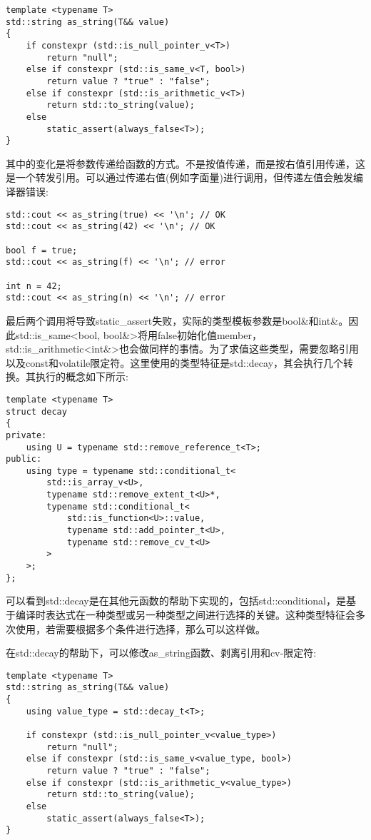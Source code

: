 \begin{lstlisting}[style=styleCXX]
template <typename T>
std::string as_string(T&& value)
{
	if constexpr (std::is_null_pointer_v<T>)
		return "null";
	else if constexpr (std::is_same_v<T, bool>)
		return value ? "true" : "false";
	else if constexpr (std::is_arithmetic_v<T>)
		return std::to_string(value);
	else
		static_assert(always_false<T>);
}
\end{lstlisting}

其中的变化是将参数传递给函数的方式。不是按值传递，而是按右值引用传递，这是一个转发引用。可以通过传递右值(例如字面量)进行调用，但传递左值会触发编译器错误:

\begin{lstlisting}[style=styleCXX]
std::cout << as_string(true) << '\n'; // OK
std::cout << as_string(42) << '\n'; // OK

bool f = true;
std::cout << as_string(f) << '\n'; // error

int n = 42;
std::cout << as_string(n) << '\n'; // error
\end{lstlisting}

最后两个调用将导致static\_assert失败，实际的类型模板参数是bool\&和int\&。因此std::is\_same<bool, bool\&>将用false初始化值member，std::is\_arithmetic<int\&>也会做同样的事情。为了求值这些类型，需要忽略引用以及const和volatile限定符。这里使用的类型特征是std::decay，其会执行几个转换。其执行的概念如下所示:

\begin{lstlisting}[style=styleCXX]
template <typename T>
struct decay
{
private:
	using U = typename std::remove_reference_t<T>;
public:
	using type = typename std::conditional_t<
		std::is_array_v<U>,
		typename std::remove_extent_t<U>*,
		typename std::conditional_t<
			std::is_function<U>::value,
			typename std::add_pointer_t<U>,
			typename std::remove_cv_t<U>
		>
	>;
};
\end{lstlisting}

可以看到std::decay是在其他元函数的帮助下实现的，包括std::conditional，是基于编译时表达式在一种类型或另一种类型之间进行选择的关键。这种类型特征会多次使用，若需要根据多个条件进行选择，那么可以这样做。

在std::decay的帮助下，可以修改as\_string函数、剥离引用和cv-限定符:

\begin{lstlisting}[style=styleCXX]
template <typename T>
std::string as_string(T&& value)
{
	using value_type = std::decay_t<T>;

	if constexpr (std::is_null_pointer_v<value_type>)
		return "null";
	else if constexpr (std::is_same_v<value_type, bool>)
		return value ? "true" : "false";
	else if constexpr (std::is_arithmetic_v<value_type>)
		return std::to_string(value);
	else
		static_assert(always_false<T>);
}
\end{lstlisting}

